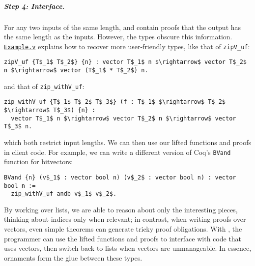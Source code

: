 \subparagraph*{Step 4: Interface.}
For any two inputs of the same length,  and  contain proofs
that the output has the same length as the inputs.
However, the types obscure this information.
\href{http://github.com/uwplse/ornamental-search/blob/itp+equiv/plugin/coq/examples/Example.v}{\lstinline{Example.v}} explains how to recover more user-friendly types, like that of \lstinline{zipV_uf}:
\begin{lstlisting}
zipV_uf {T$_1$ T$_2$} {n} : vector T$_1$ n $\rightarrow$ vector T$_2$ n $\rightarrow$ vector (T$_1$ * T$_2$) n.
\end{lstlisting}
and that of \lstinline{zip_withV_uf}:
\begin{lstlisting}
zip_withV_uf {T$_1$ T$_2$ T$_3$} (f : T$_1$ $\rightarrow$ T$_2$ $\rightarrow$ T$_3$) {n} : 
  vector T$_1$ n $\rightarrow$ vector T$_2$ n $\rightarrow$ vector T$_3$ n.
\end{lstlisting}
which both restrict input lengths.
We can then use our lifted functions and proofs in client code.
For example, we can write a different version of Coq's
\lstinline{BVand} function for bitvectors:
\begin{lstlisting}
BVand {n} (v$_1$ : vector bool n) (v$_2$ : vector bool n) : vector bool n := 
  zip_withV_uf andb v$_1$ v$_2$.
\end{lstlisting}
By working over lists, we are able to reason about only the interesting pieces, thinking about indices only
when relevant; in contrast, when writing proofs over vectors, even simple theorems
can generate tricky proof obligations.
With \toolnameb, the programmer can use the lifted functions and proofs
to interface with code that uses vectors, then switch back to lists when vectors are unmanageable. 
In essence, ornaments form the glue between these types.


